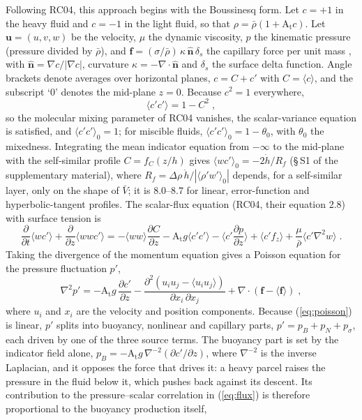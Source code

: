 \documentclass[lineno]{jfm}
\newcommand{\avg}[1]{\langle #1\rangle}
\newcommand{\At}{\mathrm{A_t}}
\newcommand{\hd}{\dot h}
\newcommand{\pd}[2]{\frac{\partial #1}{\partial #2}}
\begin{document}
Following RC04, this approach begins with the Boussinesq form. Let $c = +1$ in the heavy fluid and $c = -1$ in the light fluid, so that $\rho = \bar\rho(1 + \At c)$. Let $\mathbf u = (u, v, w)$ be the velocity, $\mu$ the dynamic viscosity, $p$ the kinematic pressure (pressure divided by $\bar\rho$), and $\mathbf f = (\sigma/\bar\rho) \, \kappa \, \hat{\mathbf n} \, \delta_s$ the capillary force per unit mass \citep{Brackbill1992}, with $\hat{\mathbf n} = \nabla c/| \nabla c |$, curvature $\kappa = -\nabla \cdot \hat{\mathbf n}$ and $\delta_s$ the surface delta function. Angle brackets denote averages over horizontal planes, $c = C + c'$ with $C = \avg c$, and the subscript `$0$' denotes the mid-plane $z = 0$. Because $c^2 = 1$ everywhere,
\begin{equation}
  \avg{c' c'} = 1 - C^2 \;,
  \label{eq:constraint}
\end{equation}
so the molecular mixing parameter of RC04 vanishes, the scalar-variance equation is satisfied, and $\avg{c' c'}_0 = 1$; for miscible fluids, $\avg{c' c'}_0 = 1 - \theta_0$, with $\theta_0$ the mixedness. Integrating the mean indicator equation from $-\infty$ to the mid-plane with the self-similar profile $C = f_C(z/h)$ gives $\avg{w c'}_0 = -2 \hd/R_f$ (\S\,S1 of the supplementary material), where $R_f = \Delta \rho \, \hd/| \avg{\rho' w'}_0 |$ depends, for a self-similar layer, only on the shape of $\bar V$; it is $8.0$--$8.7$ for linear, error-function and hyperbolic-tangent profiles. The scalar-flux equation (RC04, their equation 2.8) with surface tension is
\begin{equation}
  \pd{}{t} \avg{w c'} + \pd{}{z} \avg{w w c'} = -\avg{w w} \pd{C}{z} - \At g \avg{c' c'} - \Big\langle c' \pd{p}{z} \Big\rangle + \avg{c' f_z} + \frac{\mu}{\bar\rho} \avg{c' \nabla^2 w} \;.
  \label{eq:flux}
\end{equation}
Taking the divergence of the momentum equation gives a Poisson equation for the pressure fluctuation $p'$,
\begin{equation}
  \nabla^2 p' = -\At g \, \pd{c'}{z} - \frac{\partial^2 (u_i u_j - \avg{u_i u_j})}{\partial x_i \, \partial x_j} + \nabla \cdot (\mathbf f - \avg{\mathbf f}) \;,
  \label{eq:poisson}
\end{equation}
where $u_i$ and $x_i$ are the velocity and position components. Because (\ref{eq:poisson}) is linear, $p'$ splits into buoyancy, nonlinear and capillary parts, $p' = p_B + p_N + p_\sigma$, each driven by one of the three source terms. The buoyancy part is set by the indicator field alone, $p_B = -\At g \, \nabla^{-2} (\partial c'/\partial z)$, where $\nabla^{-2}$ is the inverse Laplacian, and it opposes the force that drives it: a heavy parcel raises the pressure in the fluid below it, which pushes back against its descent. Its contribution to the pressure--scalar correlation in (\ref{eq:flux}) is therefore proportional to the buoyancy production itself,
\end{document}

